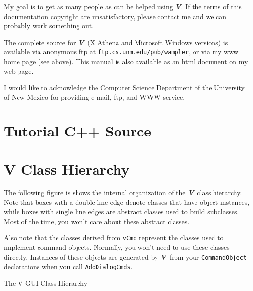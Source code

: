 \documentclass[letterpaper,draft]{book}
\newcommand{\code}{\texttt}
\newcommand{\V}{\emph{\textbf{V}}}
\newcommand{\regfont}{\normalfont\normalsize}
\begin{document}
My goal is to get as many people as can be helped using \V\@. If
the terms of this documentation copyright are unsatisfactory, please
contact me and we can probably work something out.

The complete source for \V\ (X Athena and Microsoft Windows versions)
is available via anonymous ftp at \code{ftp.cs.unm.edu/pub/wampler}, or
via my www home page (see above). This manual
is also available as an html document on my web page.

I would like to acknowledge the Computer Science Department of the
University of New Mexico for providing e-mail, ftp, and WWW service.

 \setcounter{page}{2} \tableofcontents












\appendix


\chapter{Tutorial C++ Source}










\chapter{V Class Hierarchy}

The following figure is shows the internal organization of the \V\
class hierarchy. Note that boxes with a double line edge denote
classes that
have object instances, while boxes with single line edges are abstract
classes used to build subclasses.  Most of the time, you won't care
about these abstract classes.

Also note that the classes derived from \code{vCmd} represent the
classes used to implement command objects. Normally, you won't need
to use these classes directly. Instances of these objects are generated
by \V\ from your \code{CommandObject} declarations when you call
\code{AddDialogCmds}.
\newpage
\begin{center}
{\Large The V GUI Class Hierarchy}
\end{center}

\begin{center}
\vspace{.1in}
\small

\regfont
\end{center}
\printindex
\end{document}
